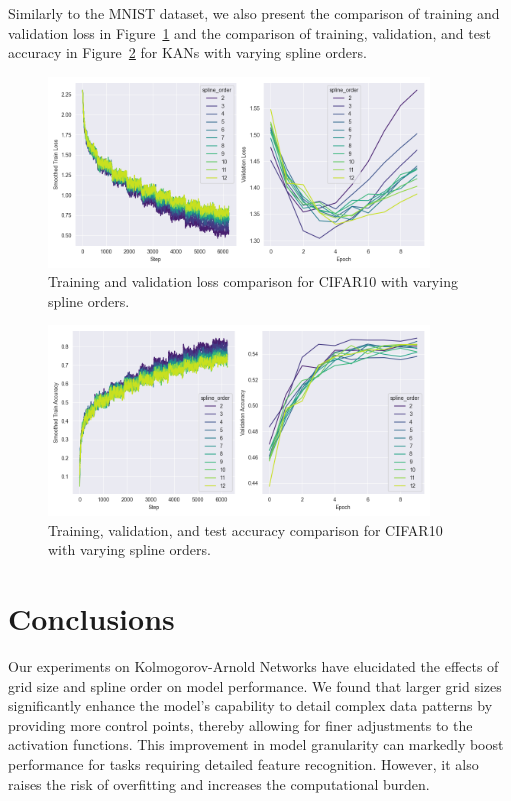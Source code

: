 \documentclass{article}
\begin{document}
Similarly to the MNIST dataset, we also present the comparison of training and validation loss in Figure~\ref{fig:cifar10_loss_spline_order}
and the comparison of training, validation, and test accuracy in Figure~\ref{fig:cifar10_accuracy_spline_order} for KANs with varying spline orders.

\begin{figure}[H]
    \centering
    \includegraphics[width=0.9\textwidth]{pics/cifar10_loss_spline_order}
    \caption{Training and validation loss comparison for CIFAR10 with varying spline orders.}
    \label{fig:cifar10_loss_spline_order}
\end{figure}

\begin{figure}[H]
    \centering
    \includegraphics[width=0.9\textwidth]{pics/cifar10_accuracy_spline_order}
    \caption{Training, validation, and test accuracy comparison for CIFAR10 with varying spline orders.}
    \label{fig:cifar10_accuracy_spline_order}
\end{figure}


\section{Conclusions}\label{sec:conclusions}
Our experiments on Kolmogorov-Arnold Networks have elucidated the effects of grid size and spline order on model performance.
We found that larger grid sizes significantly enhance the model's capability to detail complex data patterns by providing more control points,
thereby allowing for finer adjustments to the activation functions.
This improvement in model granularity can markedly boost performance for tasks requiring detailed feature recognition.
However, it also raises the risk of overfitting and increases the computational burden.
\end{document}
